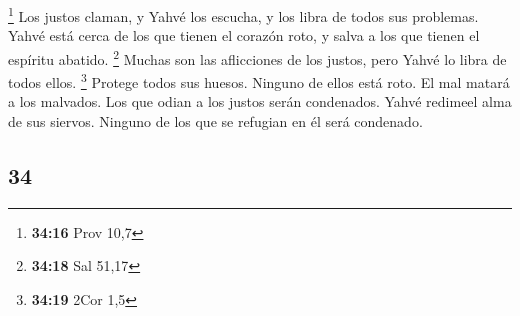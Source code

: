 \begin{paracol}{2}
\footnote{\textbf{34:16} Prov 10,7}  Los justos claman, y
Yahvé los escucha, y los libra de todos sus problemas. 
Yahvé está cerca de los que tienen el corazón roto, y salva a los que
tienen el espíritu abatido. \footnote{\textbf{34:18} Sal 51,17}
 Muchas son las aflicciones de los justos, pero Yahvé lo
libra de todos ellos. \footnote{\textbf{34:19} 2Cor 1,5} 
Protege todos sus huesos. Ninguno de ellos está roto.  El
mal matará a los malvados. Los que odian a los justos serán condenados.
 Yahvé redimeel alma de sus siervos. Ninguno de los que
se refugian en él será condenado.

\switchcolumn
\begin{otherlanguage}{english}

\hypertarget{section-67}{%
\section{34}\label{section-67}}


\end{otherlanguage}
\end{paracol}
